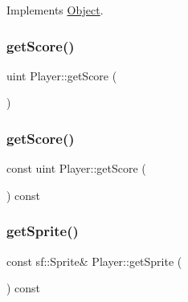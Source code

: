 Implements \mbox{\hyperlink{class_object_a3fd6370b8cfc53e5e41d09704726c2d4}{Object}}.

\mbox{\label{class_player_a7ecb56acd6bf6d77bbc3ff7f3d8cf7d8}} 
\subsubsection{\texorpdfstring{getScore()}{getScore()}\hspace{0.1cm}{\footnotesize\ttfamily [1/2]}}
{\footnotesize\ttfamily uint Player\+::get\+Score (\begin{DoxyParamCaption}{ }\end{DoxyParamCaption})\hspace{0.3cm}{\ttfamily [inline]}}

\mbox{\label{class_player_a5e084d1d883eeade8a73df72cdd855be}} 
\subsubsection{\texorpdfstring{getScore()}{getScore()}\hspace{0.1cm}{\footnotesize\ttfamily [2/2]}}
{\footnotesize\ttfamily const uint Player\+::get\+Score (\begin{DoxyParamCaption}{ }\end{DoxyParamCaption}) const\hspace{0.3cm}{\ttfamily [inline]}}

\mbox{\label{class_player_aa84e6c6cc5f2f263b9ff9841286d8c42}} 
\subsubsection{\texorpdfstring{getSprite()}{getSprite()}}
{\footnotesize\ttfamily const sf\+::\+Sprite\& Player\+::get\+Sprite (\begin{DoxyParamCaption}{ }\end{DoxyParamCaption}) const\hspace{0.3cm}{\ttfamily [inline]}}

\mbox{\label{class_player_af61ca52f651c2be22d1606a031d919eb}} 
